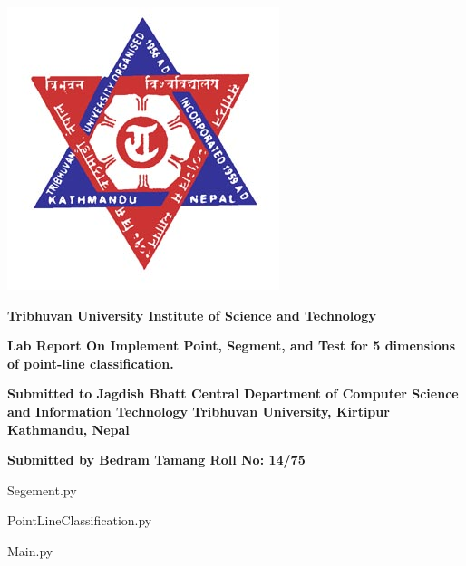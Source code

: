 \documentclass[14pt]{report}
\begin{document}
\begin{center}
\includegraphics[scale=0.5]{logo.jpg}
\end{center}

\begin{center}
\textbf{
Tribhuvan University
\linebreak
Institute of Science and Technology 
}
\end{center}


\begin{center}
\vspace{2cm}
\textbf{
Lab Report
\linebreak
On
\linebreak
Implement Point, Segment, and Test for 5 dimensions of point-line classification.  
}
\end{center}

\begin{center}
\vspace{3cm}
\textbf{
Submitted to 
\linebreak
Jagdish Bhatt
\linebreak
Central Department of Computer Science and Information Technology
\linebreak
Tribhuvan University, Kirtipur
Kathmandu, Nepal
}
\end{center}

\begin{center}
\vspace{3cm}
\textbf{
Submitted by
\linebreak
Bedram Tamang
\linebreak
Roll No: 14/75
}
\end{center}


\clearpage


Segement.py

PointLineClassification.py

Main.py

\end{document}
